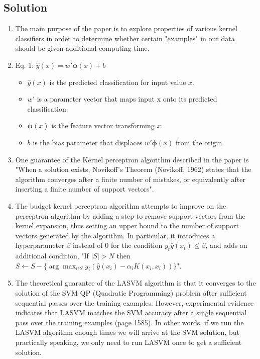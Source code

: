 \documentclass[submit]{harvardml}
\begin{document}
\subsection*{Solution}

\begin{enumerate}
	\item The main purpose of the paper is to explore properties of various kernel classifiers in order to determine whether certain "examples" in our data should be given additional computing time.
	
	\item Eq. 1: $\hat{y}(x)=w'\boldsymbol{\phi}(x)+b$
	\begin{itemize}
		\item $\hat{y}(x)$ is the predicted classification for input value $x$.
		\item $w'$ is a parameter vector that maps input x onto its predicted classification.
		\item $\boldsymbol{\phi}(x)$ is the feature vector transforming $x$.
		\item $b$ is the bias parameter that displaces $w'\boldsymbol{\phi}(x)$ from the origin.
	\end{itemize}
	
	\item One guarantee of the Kernel perceptron algorithm described in the paper is "When a solution exists, Novikoff’s Theorem (Novikoff, 1962) states that the algorithm converges after a finite number of mistakes, or equivalently after inserting a finite number of support vectors".
	
	\item The budget kernel perceptron algorithm attempts to improve on the perceptron algorithm by adding a step to remove support vectors from the kernel expansion, thus setting an upper bound to the number of support vectors generated by the algorithm. In particular, it introduces a hyperparameter $\beta$ instead of $0$ for the condition $y_t\hat{y}(x_t)\leq\beta$, and adds an additional condition, "If $|S| > N$ then $S \leftarrow S - \{\arg\max_{i\epsilon S} y_i (\hat{y}(x_i)-\alpha_i K(x_i, x_i))\}$".
	
	\item The theoretical guarantee of the LASVM algorithm is that it converges to the solution of the SVM QP (Quadratic Programming) problem after sufficient sequential passes over the training examples. However, experimental evidence indicates that LASVM matches the SVM accuracy after a single sequential pass over the training examples (page 1585). In other words, if we run the LASVM algorithm enough times we will arrive at the SVM solution, but practically speaking, we only need to run LASVM once to get a sufficient solution.
	
\end{enumerate}
\end{document}
